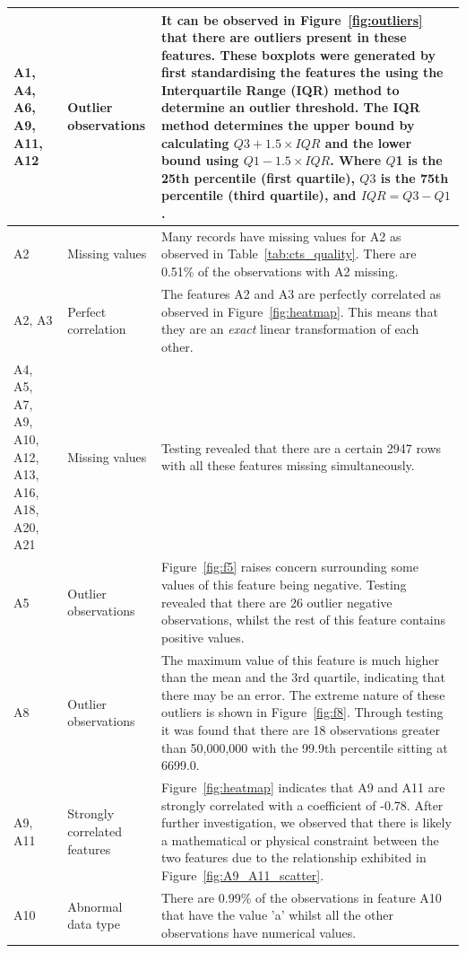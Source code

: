 \documentclass[11pt]{article}
\begin{document}
\begin{longtable}{|p{1.7cm}|p{4cm}|p{8cm}|}
	\hline 
	\endlastfoot
	A1, A4, A6, A9, A11, A12 & Outlier observations & It can be observed in Figure~\ref{fig:outliers} that there are outliers present in these features. These boxplots were generated by first standardising the features the using the Interquartile Range (IQR) method to determine an outlier threshold. The IQR method determines the upper bound by calculating $Q3 + 1.5 \times IQR$ and the lower bound using $Q1 - 1.5 \times IQR$. Where $Q$1 is the 25th percentile (first quartile), $Q3$ is the 75th percentile (third quartile), and $IQR = Q3 - Q1$.\\
	\hline
	A2 & Missing values & Many records have missing values for A2 as observed in Table~\ref{tab:cts_quality}. There are 0.51\% of the observations with A2 missing. \\
	\hline
	A2, A3 & Perfect correlation & The features A2 and A3 are perfectly correlated as observed in Figure~\ref{fig:heatmap}. This means that they are an \textit{exact} linear transformation of each other.\\
	\hline
	A4, A5, A7, A9, A10, A12, A13, A16, A18, A20, A21 & Missing values & Testing revealed that there are a certain 2947 rows with all these features missing simultaneously. \\
	\hline
	A5 & Outlier observations & Figure~\ref{fig:f5} raises concern surrounding some values of this feature being negative. Testing revealed that there are 26 outlier negative observations, whilst the rest of this feature contains positive values. \\
	\hline
	A8 & Outlier observations & The maximum value of this feature is much higher than the mean and the 3rd quartile, indicating that there may be an error. The extreme nature of these outliers is shown in Figure~\ref{fig:f8}. Through testing it was found that there are 18 observations greater than 50,000,000 with the 99.9th percentile sitting at 6699.0.\\
	\hline
	A9, A11 & Strongly correlated features & Figure~\ref{fig:heatmap} indicates that A9 and A11 are strongly correlated with a coefficient of  -0.78. After further investigation, we observed that there is likely a mathematical or physical constraint between the two features due to the relationship exhibited in Figure~\ref{fig:A9_A11_scatter}.\\
	\hline
	A10 & Abnormal data type & There are 0.99\% of the observations in feature A10 that have the value 'a' whilst all the other observations have numerical values. \\
	\hline

\end{longtable}
\end{document}
